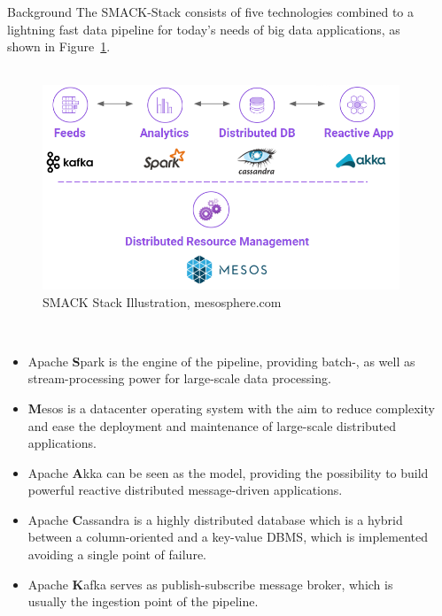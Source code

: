 \documentclass[final,hyperref={pdfpagelabels=true}]{beamer}
\begin{document}
\begin{frame}
\begin{columns}[t]
\begin{column}{.48\textwidth}
    \end{column}

    \begin{column}{.48\textwidth}
      \begin{block}{Background}
		The SMACK-Stack consists of five technologies combined to a lightning fast data pipeline for today's needs of big data applications, as shown in Figure~\ref{fig:smack_stack}.\\
		\hfill \\

		\begin{figure}[!htbp]
  			\centering
  			\includegraphics[keepaspectratio=true,scale=1.1]{figures/smack_stack}
    			\caption{SMACK Stack Illustration, mesosphere.com}
  			\label{fig:smack_stack}
		\end{figure}

	\hfill \\

		\begin{itemize}
 		   \item Apache \textbf{S}park is the engine of the pipeline, providing batch-, as well as stream-processing power for large-scale data processing.
   		 \item \textbf{M}esos is a datacenter operating system with the aim to reduce complexity and ease the deployment and maintenance of large-scale distributed applications.
   		 \item Apache \textbf{A}kka can be seen as the model, providing the possibility to build powerful reactive distributed message-driven applications.
   		 \item Apache \textbf{C}assandra is a highly distributed database which is a hybrid between a column-oriented and a key-value DBMS, which is implemented avoiding a single point of failure.
   		 \item Apache \textbf{K}afka serves as publish-subscribe message broker, which is usually the ingestion point of the pipeline.
		\end{itemize}


\end{block}
\end{column}
\end{columns}
\end{frame}
\end{document}

